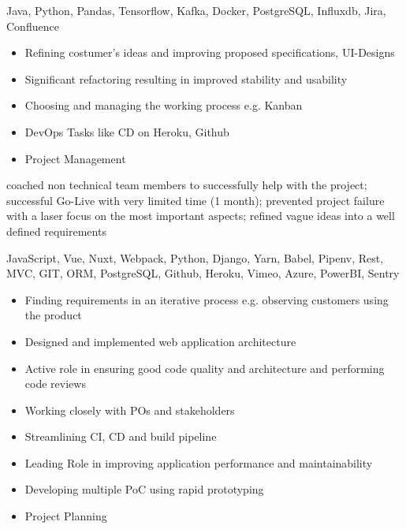 \documentclass[9pt,a4paper]{altacv}
\begin{document}
Java, Python, Pandas, Tensorflow, Kafka, Docker, PostgreSQL, Influxdb, Jira, Confluence

\divider


%

\begin{itemize}
\item Refining costumer's ideas and improving proposed specifications, UI-Designs
\item Significant refactoring resulting in improved stability and usability
\item Choosing and managing the working process e.g. Kanban
\item DevOps Tasks like CD on Heroku, Github
\item Project Management

\end{itemize}

coached non technical team members to successfully help with the project;
successful Go-Live with very limited time (1 month);
prevented project failure with a laser focus on the most important aspects;
refined vague ideas into a well defined requirements

JavaScript, Vue, Nuxt, Webpack, Python, Django, Yarn, Babel, Pipenv,
Rest, MVC, GIT, ORM, PostgreSQL, Github, Heroku, Vimeo, Azure, PowerBI, Sentry

\divider

%

\begin{itemize}
\item Finding requirements in an iterative process e.g. observing customers using the product
\item Designed and implemented web application architecture
\item Active role in ensuring good code quality and architecture and performing code reviews
\item Working closely with POs and stakeholders
\item Streamlining CI, CD and build pipeline
\item Leading Role in improving application performance and maintainability
\item Developing multiple PoC using rapid prototyping
\item Project Planning

\end{itemize}
\end{document}
